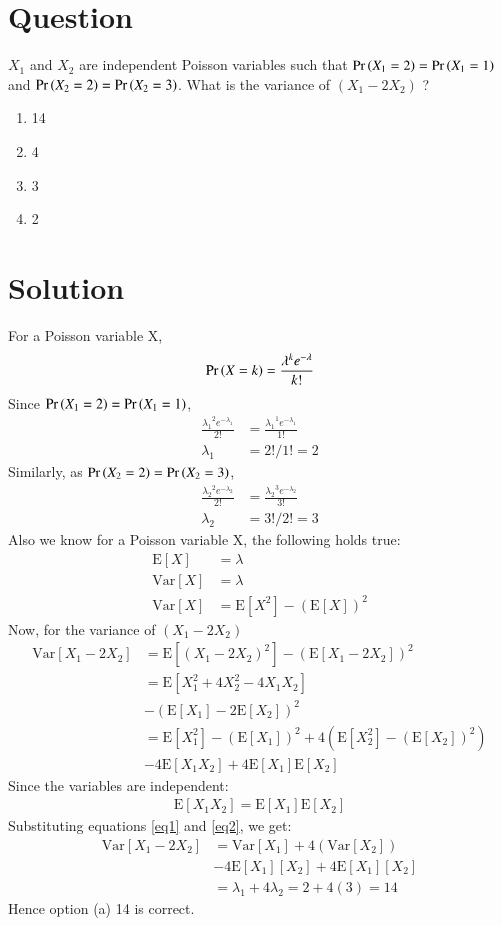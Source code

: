 \documentclass[journal,12pt,twocolumn]{IEEEtran}
\newcommand{\E}{\mathrm{E}}
\newcommand{\Var}{\mathrm{Var}}
\begin{document}
\section*{Question}
$X_1$ and $X_2$ are independent Poisson variables such that $\Pr\left(X_1=2\right) = \Pr\left(X_1=1\right)$ and $\Pr\left(X_2=2\right) = \Pr\left(X_2=3\right)$. What is the variance of $(X_1 - 2X_2)$ ?
\begin{enumerate}
    \item 14
    \item 4
    \item 3
    \item 2
\end{enumerate}
\section*{Solution}
For a Poisson variable X,
\begin{align}
\Pr\left(X=k\right) = \frac{\lambda^{k}e^{-\lambda}}{k!}
\end{align}
Since $\Pr\left(X_1=2\right) = \Pr\left(X_1=1\right)$,
\begin{align}
\frac{{\lambda_1}^{2}e^{-{\lambda_1}}}{2!} &= \frac{{\lambda_1}^{1}e^{-{\lambda_1}}}{1!} \\
\lambda_1 &= 2!/1! = 2
\end{align}
Similarly, as $\Pr\left(X_2=2\right) = \Pr\left(X_2=3\right)$,
\begin{align}
\frac{{\lambda_2}^{2}e^{-{\lambda_2}}}{2!} &= \frac{{\lambda_2}^{3}e^{-{\lambda_2}}}{3!} \\
\lambda_2 &= 3!/2! = 3
\end{align}
Also we know for a Poisson variable X, the following holds true:
\begin{align}
\E[X] &= \lambda \\
\Var[X] &= \lambda \label{eq1} \\
\Var[X] &= \E[X^2] - (\E[X])^2 \label{eq2} 
\end{align}
Now, for the variance of $(X_1 - 2X_2)$
\begin{align}
\Var[X_1 - 2X_2] &= \E[(X_1 - 2X_2)^2] - (\E[X_1 - 2X_2])^2 \nonumber \\
&= \E[X_1^2 + 4X_2^2 - 4X_1X_2] \nonumber \\
&- (\E[X_1] - 2\E[X_2])^2 \nonumber \\
&= \E[X_1^2] - (\E[X_1])^2 + 4(\E[X_2^2]-(\E[X_2])^2) \nonumber \\
&- 4\E[X_1X_2]  + 4\E[X_1]\E[X_2]
\end{align}
Since the variables are independent:
\begin{align}
\E[X_1X_2] = \E[X_1]\E[X_2]
\end{align}
Substituting equations \eqref{eq1} and \eqref{eq2}, we get:
\begin{align}
\Var[X_1 - 2X_2] &= \Var[X_1] + 4(\Var[X_2]) \nonumber \\
&- 4\E[X_1][X_2] + 4\E[X_1][X_2] \nonumber \\
&= \lambda_1 + 4\lambda_2 = 2 + 4(3) = 14
\end{align}
Hence option (a) 14 is correct.
\end{document}
